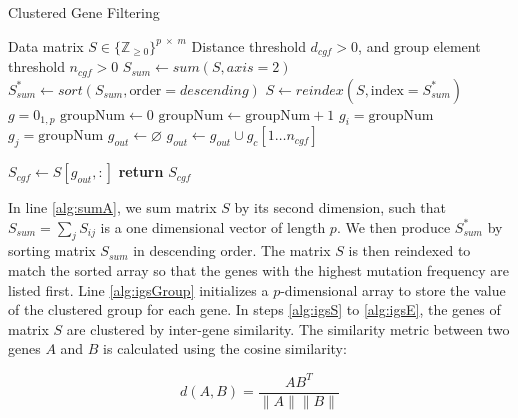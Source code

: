 {\singlespacing
\begin{algorithm}
\caption{Clustered Gene Filtering}\label{alg:cgf}
\begin{algorithmic}[1]
\Require Data matrix $S \in \{\mathbb{Z}_{\geq 0}\}^{p \; \times \; m}$
\Require Distance threshold $d_{cgf} > 0$, and group element threshold $n_{cgf} > 0$
\State $S_{sum} \gets sum(S, axis=2) $\label{alg:sumA}
\State $S_{sum}^{*} \gets sort(S_{sum}, \textrm{order}=descending)$
\State $S \gets reindex(S, \textrm{index} = S_{sum}^{*})$
\State $g = 0_{1,p}$\label{alg:igsGroup}
\State $\textrm{groupNum} \gets 0$
\label{alg:igsS}
        \State $\textrm{groupNum} \gets \textrm{groupNum} + 1$
        \State $g_i = \textrm{groupNum}$
                    \State $g_j = \textrm{groupNum}$
                \EndIf
            \EndIf
        \EndFor    
    \EndIf
\EndFor\label{alg:igsE}
\State $g_{out} \gets \varnothing$\label{alg:igsOut}
            \State $g_{out} \gets g_{out} \cup g_{c}[1 \dotsc n_{cgf}]$
        \EndIf
    \EndFor
\EndFor

\State $S_{cgf} \gets S[g_{out},:]$
\State \textbf{return} $S_{cgf}$%
\EndProcedure
\end{algorithmic}
\end{algorithm}}

\noindent
In line \ref{alg:sumA}, we sum matrix $S$ by its second dimension, such that $S_{sum} = \sum_{j} S_{ij}$ is a one dimensional vector of length $p$. We then produce $S_{sum}^{*}$ by sorting matrix $S_{sum}$ in descending order. The matrix $S$ is then reindexed to match the sorted array so that the genes with the highest mutation frequency are listed first. Line \ref{alg:igsGroup} initializes a $p$-dimensional array to store the value of the clustered group for each gene. In steps \ref{alg:igsS} to \ref{alg:igsE}, the genes of matrix $S$ are clustered by inter-gene similarity. The similarity metric between two genes $A$ and $B$ is calculated using the cosine similarity:

\begin{equation}
    d(A,B)= \frac{AB^{T}}{\lVert A \rVert \lVert B \rVert}
\end{equation}

